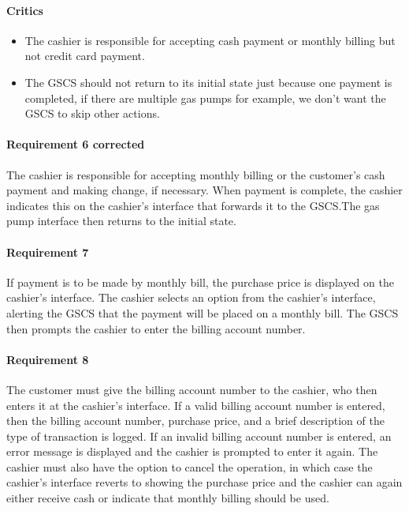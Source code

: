 \begin{framed}
    \paragraph{Critics}
    \begin{itemize}
        \item The cashier is responsible for accepting cash payment or
            monthly billing but not credit card payment.
        \item The GSCS should not return to its initial state just because one
        payment is completed, if there are multiple gas pumps for example, we
        don't want the GSCS to skip other actions.
    \end{itemize}

    \paragraph{Requirement 6 corrected} The cashier is responsible for accepting
    monthly billing or the
    customer's cash payment and making change, if necessary. When payment is
    complete, the cashier indicates this on the cashier's interface that
    forwards it to the GSCS.\@ The gas
    pump interface then returns to the initial state.
\end{framed}

\paragraph{Requirement 7} If payment is to be made by monthly bill, the
purchase price is displayed on the cashier's interface. The cashier
selects an option from the cashier's interface, alerting the GSCS that the
payment will be placed on a monthly bill. The GSCS then prompts the cashier
to enter the billing account number.

\paragraph{Requirement 8} The customer must give the billing account number
to the cashier, who then enters it at the cashier's interface. If a valid
billing account number is entered, then the billing account number, purchase
price, and a brief description of the type of transaction is logged. If an
invalid billing account number is entered, an error message is displayed
and the cashier is prompted to enter it again. The cashier must also have
the option to cancel the operation, in which case the cashier's interface
reverts to showing the purchase price and the cashier can again either
receive cash or indicate that monthly billing should be used.

